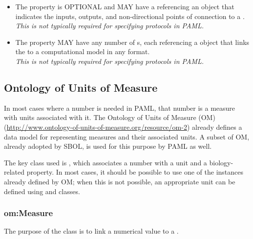 \begin{itemize}
\item \label{sec:sbol:hasInterface}
The  property is OPTIONAL and MAY have a  referencing an  object that indicates the inputs, outputs, and non-directional points of connection to a .
\\{\em This is not typically required for specifying protocols in PAML.}

\item \label{sec:sbol:hasModel}
The  property MAY have any number of s, each referencing a  object that links the  to a computational model in any format.
\\{\em This is not typically required for specifying protocols in PAML.}
\end{itemize}


\subsection{Ontology of Units of Measure}

In most cases where a number is needed in PAML, that number is a measure with units associated with it.
The Ontology of Units of Measure (OM) (\url{http://www.ontology-of-units-of-measure.org/resource/om-2}) already defines a data model for representing measures and their associated units. 
A subset of OM, already adopted by SBOL, is used for this purpose by PAML as well.

The key class used is , which associates a number with a unit and a biology-related property.
In most cases, it should be possible to use one of the  instances already defined by OM; when this is not possible, an appropriate unit can be defined using  and  classes.

\subsubsection{om:Measure} \label{sec:om:Measure}

The purpose of the  class is to link a numerical value to a . 

